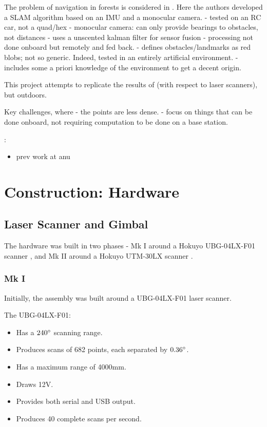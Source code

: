 \documentclass[12pt,oneside,a4paper]{book}
\begin{document}
The problem of navigation in forests is considered in
\cite{langelaan2005towards}. Here the authors developed a SLAM
algorithm based on an IMU and a monocular camera.
- tested on an RC car, not a quad/hex
- monocular camera: can only provide bearings to obstacles, not
distances
- uses a unscented kalman filter for sensor fusion
- processing not done onboard but remotely and fed back.
- defines obstacles/landmarks as red blobs; not so generic. Indeed,
tested in an entirely artificial environment.
- includes some a priori knowledge of the environment to get a decent
origin. 

This project attempts to replicate the results of
\cite{achtelik2009stereo} (with respect to laser scanners), but
outdoors. 

Key challenges, where
 - the points are less dense.
 - focus on things that can be done onboard, not requiring computation
 to be done on a base station.


\cite{robust}:
\begin{itemize}
\item prev work at anu
\end{itemize}



\chapter{Construction: Hardware}
\label{sec:hardware}

\section{Laser Scanner and Gimbal}
\label{sec:laser-scanner-gimbal}

The hardware was built in two phases - Mk I around a Hokuyo
UBG-04LX-F01 scanner \cite{scanner1}, and Mk II around a Hokuyo UTM-30LX scanner \cite{scanner2}. 

\subsection{Mk I}
\label{sec:mk-i}

Initially, the assembly was built around a UBG-04LX-F01 laser
scanner.

The UBG-04LX-F01:
\begin{itemize}
\item Has a $240\degree$ scanning range.
\item Produces scans of 682 points, each separated by $0.36\degree$.
\item Has a maximum range of 4000mm.
\item Draws 12V.
\item Provides both serial and USB output.
\item Produces 40 complete scans per second.
\end{itemize}
\end{document}
